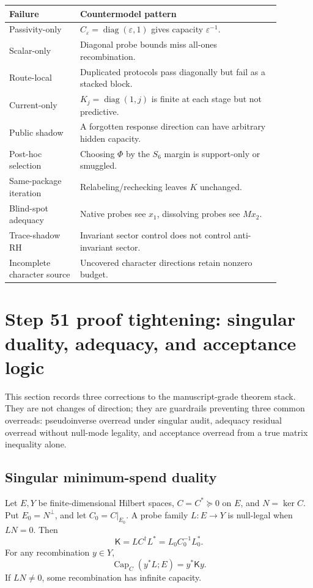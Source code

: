 \documentclass[11pt]{article}
\DeclareMathOperator{\Capacity}{Cap}
\DeclareMathOperator{\diag}{diag}
\newcommand{\K}{\mathsf K}
\newcommand{\eps}{\varepsilon}
\begin{document}
\begin{longtable}{p{0.23\linewidth}p{0.65\linewidth}}
\toprule
Failure & Countermodel pattern\\
\midrule
Passivity-only & \(C_\eps=\diag(\eps,1)\) gives capacity \(\eps^{-1}\).\\
Scalar-only & Diagonal probe bounds miss all-ones recombination.\\
Route-local & Duplicated protocols pass diagonally but fail as a stacked block.\\
Current-only & \(K_j=\diag(1,j)\) is finite at each stage but not predictive.\\
Public shadow & A forgotten response direction can have arbitrary hidden capacity.\\
Post-hoc selection & Choosing \(\Phi\) by the \(S_6\) margin is support-only or smuggled.\\
Same-package iteration & Relabeling/rechecking leaves \(K\) unchanged.\\
Blind-spot adequacy & Native probes see \(x_1\), dissolving probes see \(Mx_2\).\\
Trace-shadow RH & Invariant sector control does not control anti-invariant sector.\\
Incomplete character source & Uncovered character directions retain nonzero budget.\\
\bottomrule
\end{longtable}


\section{Step 51 proof tightening: singular duality, adequacy, and acceptance logic}

This section records three corrections to the manuscript-grade theorem stack.  They are not changes of direction; they are guardrails preventing three common overreads: pseudoinverse overread under singular audit, adequacy residual overread without null-mode legality, and acceptance overread from a true matrix inequality alone.

\subsection{Singular minimum-spend duality}
Let \(E,Y\) be finite-dimensional Hilbert spaces, \(C=C^*\succeq0\) on \(E\), and \(N=\ker C\).  Put \(E_0=N^\perp\), and let \(C_0=C|_{E_0}\).  A probe family \(L:E\to Y\) is null-legal when \(LN=0\).  Then
\[
  \K=L C^\dagger L^*=L_0C_0^{-1}L_0^*.
\]
For any recombination \(y\in Y\),
\[
  \Capacity_C(y^*L;E)=y^*\K y.
\]
If \(LN\ne0\), some recombination has infinite capacity.
\end{document}

